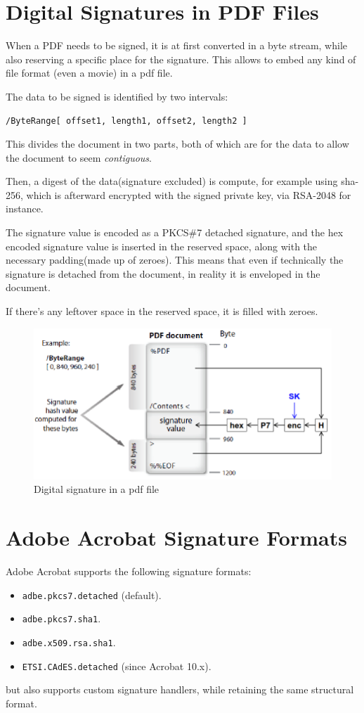 \section{Digital Signatures in PDF Files}

When a PDF needs to be signed, it is at first converted in a byte
stream, while also reserving a specific place for the signature.
This allows to embed any kind of file format (even a movie) in a pdf 
file.

The data to be signed is identified by two intervals:
\begin{verbatim}
/ByteRange[ offset1, length1, offset2, length2 ]
\end{verbatim}
This divides the document in two parts, both of which are for the data
to allow the document to seem \textit{contiguous}.

Then, a digest of the data(signature excluded) is compute, for example
using sha-256, which is afterward encrypted with the signed private
key, via RSA-2048 for instance.

The signature value is encoded as a PKCS\#7 detached signature, and
the hex encoded signature value is inserted in the reserved space,
along with the necessary padding(made up of zeroes). This means that
even if technically the signature is detached from the document, in 
reality it is enveloped in the document.

If there's any leftover space in the reserved space, it is filled with 
zeroes.

\begin{figure}[H]
  \includegraphics[width=.6\textwidth]{img/pdf digital signature.png}
  \caption{Digital signature in a pdf file}
  \label{fig:pdf digital signature}
\end{figure}


\section{Adobe Acrobat Signature Formats}
Adobe Acrobat supports the following signature formats:
\begin{itemize}
    \item \texttt{adbe.pkcs7.detached} (default).
    \item \texttt{adbe.pkcs7.sha1}.
    \item \texttt{adbe.x509.rsa.sha1}.
    \item \texttt{ETSI.CAdES.detached} (since Acrobat 10.x).
\end{itemize}
but also supports custom signature handlers, while retaining the same
structural format.

